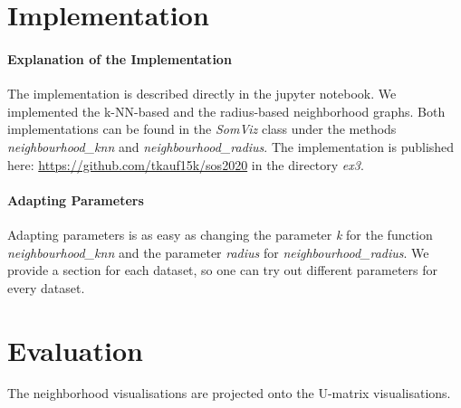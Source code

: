 \documentclass[12pt]{article}
\begin{document}
\maketitle

\section{Implementation}
\paragraph*{Explanation of the Implementation}
The implementation is described directly in the jupyter notebook.
We implemented the k-NN-based and the radius-based neighborhood graphs.
Both implementations can be found in the \textit{SomViz} class under the methods \textit{neighbourhood\_knn} and \textit{neighbourhood\_radius}.
The implementation is published here: \href{https://github.com/tkauf15k/sos2020}{https://github.com/tkauf15k/sos2020} in the directory \textit{ex3}.

\paragraph*{Adapting Parameters}
Adapting parameters is as easy as changing the parameter \textit{k} for the function \textit{neighbourhood\_knn} and the parameter \textit{radius} for \textit{neighbourhood\_radius}.
We provide a section for each dataset, so one can try out different parameters for every dataset.

\section{Evaluation}
The neighborhood visualisations are projected onto the U-matrix visualisations.
\end{document}
